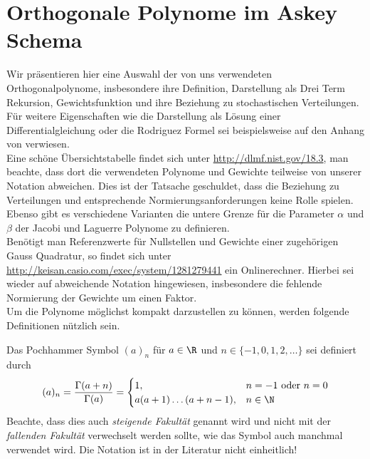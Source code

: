 
\chapter{Orthogonale Polynome im Askey Schema} %

\label{AppendixA} %

Wir präsentieren hier eine Auswahl der von uns verwendeten Orthogonalpolynome, insbesondere ihre Definition, Darstellung als Drei Term Rekursion, Gewichtsfunktion und ihre Beziehung zu stochastischen Verteilungen. Für weitere Eigenschaften wie die Darstellung als Lösung einer Differentialgleichung oder die Rodriguez Formel sei beispielsweise auf den Anhang von \autocite{dongbinxiu2010} verwiesen.\\
Eine schöne Übersichtstabelle findet sich unter \url{http://dlmf.nist.gov/18.3}, man beachte, dass dort die verwendeten Polynome und Gewichte teilweise von unserer Notation abweichen. Dies ist der Tatsache geschuldet, dass die Beziehung zu Verteilungen und entsprechende Normierungsanforderungen keine Rolle spielen. Ebenso gibt es verschiedene Varianten die untere Grenze für die Parameter $\alpha$ und $\beta$ der Jacobi und Laguerre Polynome zu definieren.\\
Benötigt man Referenzwerte für Nullstellen und Gewichte einer zugehörigen Gauss Quadratur, so findet sich unter\\\url{http://keisan.casio.com/exec/system/1281279441} ein Onlinerechner. Hierbei sei wieder auf abweichende Notation hingewiesen, insbesondere die fehlende Normierung der Gewichte um einen Faktor.\\
Um die Polynome möglichst kompakt darzustellen zu können, werden folgende Definitionen nützlich sein.
\begin{mathdef}
Das Pochhammer Symbol $(a)_n$ für $a\in\R$ und $n\in\lbrace -1,0,1,2,\dots\rbrace$ sei definiert durch
\[(a)_n=\frac{\Gamma(a+n)}{\Gamma(a)}=
   \begin{cases}
   1, &n=-1\text{ oder } n=0\\
   a(a+1)\dots (a+n-1), &n\in\N
   \end{cases}
   \]
Beachte, dass dies auch \emph{steigende Fakultät} genannt wird und nicht mit der \emph{fallenden Fakultät} verwechselt werden sollte, wie das Symbol auch manchmal verwendet wird. Die Notation ist in der Literatur nicht einheitlich!
\end{mathdef}

